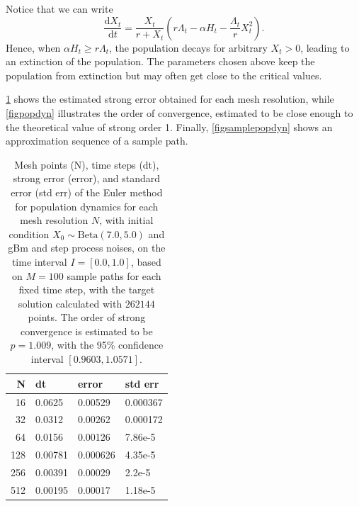 \documentclass[reqno,12pt]{amsart}
\theoremstyle{plain} %
\theoremstyle{definition} %
\begin{document}
Notice that we can write
\[
    \frac{\mathrm{d}X_t}{\mathrm{d}t} = \frac{X_t}{r + X_t} \left(r\Lambda_t - \alpha H_t - \frac{\Lambda_t}{r} X_t^2\right).
\]
Hence, when $\alpha H_t \geq r\Lambda_t$, the population decays for arbitrary $X_t > 0$, leading to an extinction of the population. The parameters chosen above keep the population from extinction but may often get close to the critical values.

\cref{tabpopdyn} shows the estimated strong error obtained for each mesh resolution, while \cref{figpopdyn} illustrates the order of convergence, estimated to be close enough to the theoretical value of strong order 1. Finally, \cref{figsamplepopdyn} shows an approximation sequence of a sample path.

\begin{table}
    \begin{center}
        \begin{tabular}[htb]{|r|l|l|l|}
            \hline N & dt & error & std err \\
            \hline \hline
            16 & 0.0625 & 0.00529 & 0.000367 \\
            32 & 0.0312 & 0.00262 & 0.000172 \\
            64 & 0.0156 & 0.00126 & 7.86e-5 \\
            128 & 0.00781 & 0.000626 & 4.35e-5 \\
            256 & 0.00391 & 0.00029 & 2.2e-5 \\
            512 & 0.00195 & 0.00017 & 1.18e-5 \\
            \hline
        \end{tabular}
    \end{center}

    \bigskip

    \caption{Mesh points (N), time steps (dt), strong error (error), and standard error (std err) of the Euler method for population dynamics for each mesh resolution $N$, with initial condition $X_0 \sim \mathrm{Beta}(7.0, 5.0)$ and gBm and step process noises, on the time interval $I = [0.0, 1.0]$, based on $M = 100$ sample paths for each fixed time step, with the target solution calculated with $262144$ points. The order of strong convergence is estimated to be $p = 1.009$, with the 95\% confidence interval $[0.9603, 1.0571]$.}

    \label{tabpopdyn}
\end{table}
\end{document}
